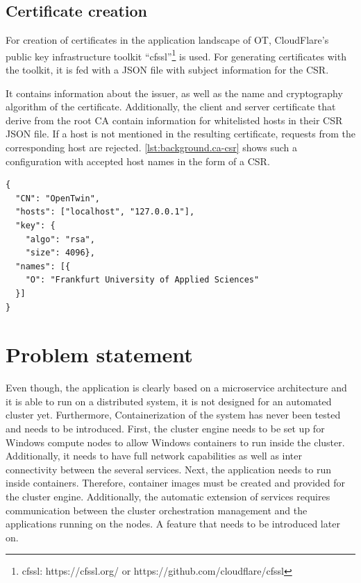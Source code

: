 \subsection{Certificate creation}
For creation of certificates in the application landscape of \ac{OT}, CloudFlare's public key infrastructure toolkit \enquote{cfssl}\footnote{cfssl: https://cfssl.org/ or https://github.com/cloudflare/cfssl} is used.
For generating certificates with the toolkit, it is fed with a JSON file with subject information for the \ac{CSR}.

It contains information about the issuer, as well as the name and cryptography algorithm of the certificate.
Additionally, the client and server certificate that derive from the root \ac{CA} contain information for whitelisted hosts in their \ac{CSR} JSON file. If a host is not mentioned in the resulting certificate, requests from the corresponding host are rejected.
\autoref{lst:background.ca-csr} shows such a configuration with accepted host names in the form of a \ac{CSR}.

\begin{lstlisting}[label=lst:background.ca-csr, caption={Example of meta data in form of \ac{CSR} configuration. \enquote{CN} is the certificate name. \enquote{hosts} describes the accepted hostnames, \enquote{key} describes information about the cryptography algorithm, \enquote{names} contains meta data of the organization}]
{
  "CN": "OpenTwin",
  "hosts": ["localhost", "127.0.0.1"],
  "key": {
    "algo": "rsa",
    "size": 4096},
  "names": [{
    "O": "Frankfurt University of Applied Sciences"
  }]
}
\end{lstlisting}


\section{Problem statement}
Even though, the application is clearly based on a microservice architecture and it is able to run on a distributed system, it is not designed for an automated cluster yet.
Furthermore, Containerization of the system has never been tested and needs to be introduced. 
First, the cluster engine needs to be set up for \ac{Windows} compute nodes to allow \ac{Windows} containers to run inside the cluster. Additionally, it needs to have full network capabilities as well as inter connectivity between the several services.
Next, the application needs to run inside containers. Therefore, container images must be created and provided for the cluster engine. 
Additionally, the automatic extension of services requires communication between the cluster orchestration management and the applications running on the nodes. A feature that needs to be introduced later on.

